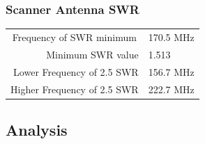 \documentclass{article}
\begin{document}
\subsubsection{Scanner Antenna SWR}
\begin{table}[H]
	\begin{tabular}{rl}
	\multicolumn{1}{c}{Frequency of SWR minimum} & 170.5 MHz \\
	Minimum SWR value                            & 1.513     \\
	Lower Frequency of 2.5 SWR                   & 156.7 MHz \\
	Higher Frequency of 2.5 SWR                  & 222.7 MHz            
	\end{tabular}
\end{table}

\subsection{Analysis}
\end{document}
